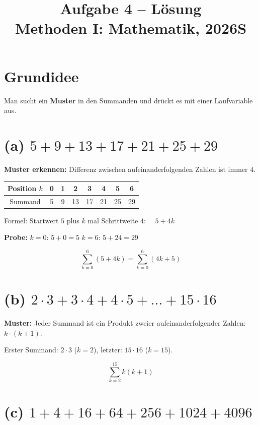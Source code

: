 \documentclass[12pt, a4paper]{article}
\title{\textbf{Aufgabe 4 -- Lösung} \\ Methoden I: Mathematik, 2026S}
\author{}
\date{}
\begin{document}
\maketitle

\section*{Grundidee}

Man sucht ein \textbf{Muster} in den Summanden und drückt es mit einer Laufvariable aus.

\section*{(a) $5 + 9 + 13 + 17 + 21 + 25 + 29$}

\textbf{Muster erkennen:} Differenz zwischen aufeinanderfolgenden Zahlen ist immer $4$.

\begin{tabular}{c|ccccccc}
    Position $k$ & 0 & 1 & 2 & 3 & 4 & 5 & 6 \\
    \hline
    Summand & 5 & 9 & 13 & 17 & 21 & 25 & 29
\end{tabular}

Formel: Startwert $5$ plus $k$ mal Schrittweite $4$: $\quad 5 + 4k$

\textbf{Probe:} $k = 0$: $5 + 0 = 5$ \checkmark \quad $k = 6$: $5 + 24 = 29$ \checkmark

\[
    \boxed{\sum_{k=0}^{6} (5 + 4k) = \sum_{k=0}^{6} (4k + 5)}
\]

\section*{(b) $2 \cdot 3 + 3 \cdot 4 + 4 \cdot 5 + \ldots + 15 \cdot 16$}

\textbf{Muster:} Jeder Summand ist ein Produkt zweier aufeinanderfolgender Zahlen: $k \cdot (k+1)$.

Erster Summand: $2 \cdot 3$ ($k = 2$), letzter: $15 \cdot 16$ ($k = 15$).

\[
    \boxed{\sum_{k=2}^{15} k(k+1)}
\]

\section*{(c) $1 + 4 + 16 + 64 + 256 + 1024 + 4096$}
\end{document}
